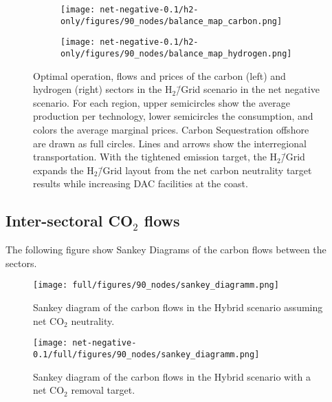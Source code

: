 \documentclass[twocolumn]{article}
\newcommand{\carbon}{CO$_2$}
\newcommand{\hydrogengrid}{H$_2$\=/Grid}
\newcommand{\hydrogenscenario}{H$_2$\=/Grid scenario}
\newcommand{\hybridscenario}{Hybrid scenario}
\begin{document}
\begin{figure}[ht!]
    \centering
    \begin{subfigure}{.5\textwidth}
        \centering
        \texttt{[image: net-negative-0.1/h2-only/figures/90\_nodes/balance\_map\_carbon.png]}
        \label{fig:balance_map_carbon_h2_nn}
    \end{subfigure}%
    \begin{subfigure}{.5\textwidth}
        \centering
        \texttt{[image: net-negative-0.1/h2-only/figures/90\_nodes/balance\_map\_hydrogen.png]}
        \label{fig:balance_map_hydrogen_h2_nn}
    \end{subfigure}
    \caption{Optimal operation, flows and prices of the carbon (left) and hydrogen (right) sectors in the \hydrogenscenario{} in the net negative scenario. For each region, upper semicircles show the average production per technology, lower semicircles the consumption, and colors the average marginal prices. Carbon Sequestration offshore are drawn as full circles. Lines and arrows show the interregional transportation. With the tightened emission target, the \hydrogengrid{} expands the \hydrogengrid{} layout from the net carbon neutrality target results while increasing DAC facilities at the coast.
    }
    \label{fig:balance_maps_h2_nn}
\end{figure}


\clearpage
\subsection{Inter-sectoral \carbon{} flows}

The following figure show Sankey Diagrams of the carbon flows between the sectors.

\begin{figure}[h!]
    \centering
    \texttt{[image: full/figures/90\_nodes/sankey\_diagramm.png]}
    \caption{Sankey diagram of the carbon flows in the \hybridscenario{} assuming net \carbon{} neutrality.}
    \label{fig:sankey_diagramm}
\end{figure}


\begin{figure}
    \centering
    \texttt{[image: net-negative-0.1/full/figures/90\_nodes/sankey\_diagramm.png]}
    \caption{Sankey diagram of the carbon flows in the \hybridscenario{} with a net \carbon{} removal target.}
    \label{fig:sankey_diagramm_nn}
\end{figure}
\end{document}
